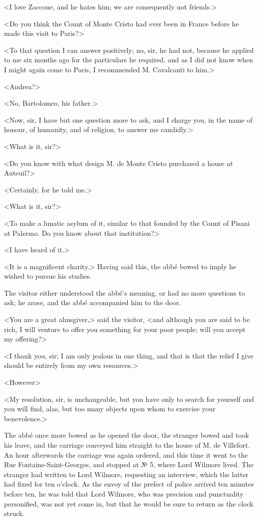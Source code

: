  <I love Zaccone, and he hates him; we are consequently not friends.> 

 <Do you think the Count of Monte Cristo had ever been in France before he made this visit to Paris?> 

 <To that question I can answer positively; no, sir, he had not, because he applied to me six months ago for the particulars he required, and as I did not know when I might again come to Paris, I recommended M. Cavalcanti to him.> 

 <Andrea?> 

 <No, Bartolomeo, his father.> 

 <Now, sir, I have but one question more to ask, and I charge you, in the name of honour, of humanity, and of religion, to answer me candidly.> 

 <What is it, sir?> 

 <Do you know with what design M. de Monte Cristo purchased a house at Auteuil?> 

 <Certainly, for he told me.> 

 <What is it, sir?> 

 <To make a lunatic asylum of it, similar to that founded by the Count of Pisani at Palermo. Do you know about that institution?> 

 <I have heard of it.> 

 <It is a magnificent charity.> Having said this, the abbé bowed to imply he wished to pursue his studies. 

 The visitor either understood the abbé's meaning, or had no more questions to ask; he arose, and the abbé accompanied him to the door. 

 <You are a great almsgiver,> said the visitor, <and although you are said to be rich, I will venture to offer you something for your poor people; will you accept my offering?> 

 <I thank you, sir; I am only jealous in one thing, and that is that the relief I give should be entirely from my own resources.> 

 <However\longdash> 

 <My resolution, sir, is unchangeable, but you have only to search for yourself and you will find, alas, but too many objects upon whom to exercise your benevolence.> 

 The abbé once more bowed as he opened the door, the stranger bowed and took his leave, and the carriage conveyed him straight to the house of M. de Villefort. An hour afterwards the carriage was again ordered, and this time it went to the Rue Fontaine-Saint-Georges, and stopped at № 5, where Lord Wilmore lived. The stranger had written to Lord Wilmore, requesting an interview, which the latter had fixed for ten o'clock. As the envoy of the prefect of police arrived ten minutes before ten, he was told that Lord Wilmore, who was precision and punctuality personified, was not yet come in, but that he would be sure to return as the clock struck. 

